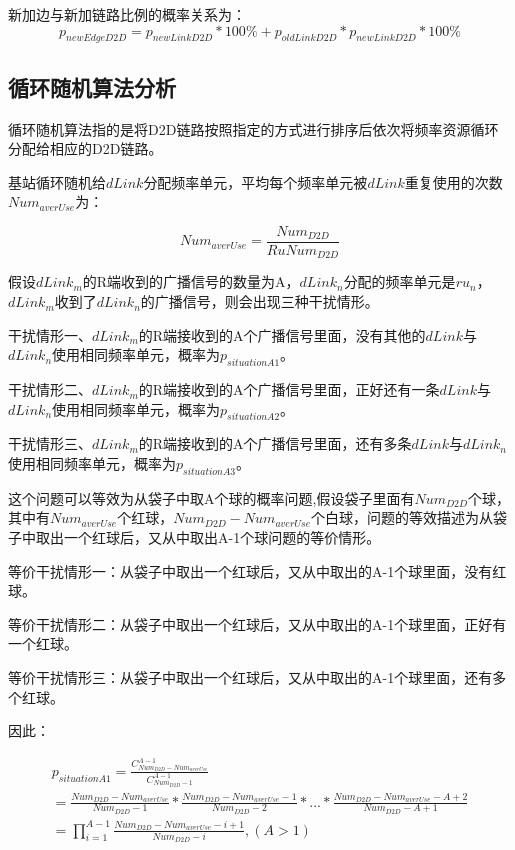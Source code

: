 \documentclass[figurelist,tablelist,algorithmlist,nomlist,masters]{seuthesix}
\begin{document}
	新加边与新加链路比例的概率关系为：
	\begin{equation}\label{eq3.1}
	{p_{newEdgeD2D}} = {p_{newLinkD2D}}*100\%  + {p_{oldLinkD2D}}*{p_{newLinkD2D}}*100\% 
	\end{equation}
	
	\subsection{循环随机算法分析}
	
	循环随机算法指的是将D2D链路按照指定的方式进行排序后依次将频率资源循环分配给相应的D2D链路。
	
	基站循环随机给$dLink$分配频率单元，平均每个频率单元被$dLink$重复使用的次数$Nu{m_{averUse}}$为： 
	
	\begin{equation}\label{eq3.1}
	Nu{m_{averUse}} = \frac{{Nu{m_{D2D}}}}{{RuNu{m_{D2D}}}}
	\end{equation}
	
	假设$dLink_m$的R端收到的广播信号的数量为A，$dLink_n$分配的频率单元是$r{u_n}$，$dLink_m$收到了$dLink_n$的广播信号，则会出现三种干扰情形。
	
	干扰情形一、$dLink_m$的R端接收到的A个广播信号里面，没有其他的$dLink$与$dLink_n$使用相同频率单元，概率为${p_{situationA1}}$。
	
	干扰情形二、$dLink_m$的R端接收到的A个广播信号里面，正好还有一条$dLink$与$dLink_n$使用相同频率单元，概率为${p_{situationA2}}$。
	
	干扰情形三、$dLink_m$的R端接收到的A个广播信号里面，还有多条$dLink$与$dLink_n$使用相同频率单元，概率为${p_{situationA3}}$。
	
	这个问题可以等效为从袋子中取A个球的概率问题,假设袋子里面有$Nu{m_{D2D}}$个球，其中有$Nu{m_{averUse}}$个红球，$Nu{m_{D2D}} - Nu{m_{averUse}}$个白球，问题的等效描述为从袋子中取出一个红球后，又从中取出A-1个球问题的等价情形。
	
	等价干扰情形一：从袋子中取出一个红球后，又从中取出的A-1个球里面，没有红球。
	
	等价干扰情形二：从袋子中取出一个红球后，又从中取出的A-1个球里面，正好有一个红球。
	
	等价干扰情形三：从袋子中取出一个红球后，又从中取出的A-1个球里面，还有多个红球。
	
	因此：
	
	\begin{equation}\label{eq3.1}
	\begin{array}{c}
	{p_{situationA1}} = \frac{{C_{Nu{m_{D2D}} - Nu{m_{averUse}}}^{A - 1}}}{{C_{Nu{m_{D2D}} - 1}^{A - 1}}}\\
	= \frac{{Nu{m_{D2D}} - Nu{m_{averUse}}}}{{Nu{m_{D2D}} - 1}}*\frac{{Nu{m_{D2D}} - Nu{m_{averUse}} - 1}}{{Nu{m_{D2D}} - 2}}*...*\frac{{Nu{m_{D2D}} - Nu{m_{averUse}} - A + 2}}{{Nu{m_{D2D}} - A + 1}}\\
	= \prod\limits_{i = 1}^{A - 1} {\frac{{Nu{m_{D2D}} - Nu{m_{averUse}} - i + {1}}}{{Nu{m_{D2D}} - i}},(A > 1)} 
	\end{array}
	\end{equation}
	
\end{document}
